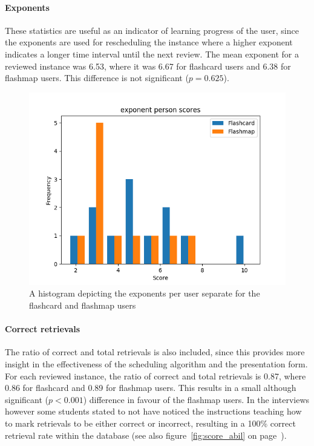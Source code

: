 \paragraph{Exponents} These statistics are useful as an indicator of learning progress of the user, since the exponents are used for rescheduling the instance where a higher exponent indicates a longer time interval until the next review. The mean exponent for a reviewed instance was 6.53, where it was 6.67 for flashcard users and 6.38 for flashmap users. This difference is not significant ($p=0.625$).

\begin{figure}
    \centering
    \includegraphics[width=.7\textwidth]{img/exponent_abil.png}
    \caption{A histogram depicting the exponents per user separate for the flashcard and flashmap users}
    \label{fig:exponent_abil}
\end{figure}

\paragraph{Correct retrievals} The ratio of correct and total retrievals is also included, since this provides more insight in the effectiveness of the scheduling algorithm and the presentation form. For each reviewed instance, the ratio of correct and total retrievals is 0.87, where 0.86 for flashcard and 0.89 for flashmap users. This results in a small although significant ($p<0.001$) difference in favour of the flashmap users. In the interviews however some students stated to not have noticed the instructions teaching how to mark retrievals to be either correct or incorrect, resulting in a 100\% correct retrieval rate within the database (see also figure~\ref{fig:score_abil} on page~\pageref{fig:score_abil}).

